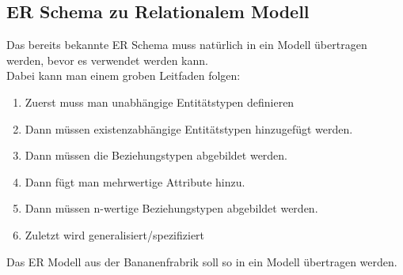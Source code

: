\documentclass{article}
\begin{document}
	\subsection{ER Schema zu Relationalem Modell}
	Das bereits bekannte ER Schema muss natürlich in ein Modell übertragen werden, bevor es verwendet werden kann. \\
	Dabei kann man einem groben Leitfaden folgen:
	\begin{enumerate}
		\item{Zuerst muss man unabhängige Entitätstypen definieren}
		\item{Dann müssen existenzabhängige Entitätstypen hinzugefügt werden.}
		\item{Dann müssen die Beziehungstypen abgebildet werden.}
		\item{Dann fügt man mehrwertige Attribute hinzu.}
		\item{Dann müssen n-wertige Beziehungstypen abgebildet werden.}
		\item{Zuletzt wird generalisiert/spezifiziert}
	\end{enumerate}
	Das ER Modell aus der Bananenfrabrik soll so in ein Modell übertragen werden. \\
\end{document}
